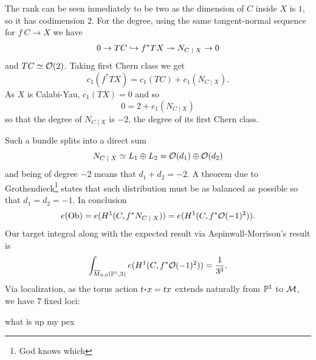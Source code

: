 \documentclass[12pt]{memoir}
\begin{document}
\begin{ptcbp}
    The rank can be seen inmediately to be two as the dimension of $C$ inside $X$ is $1$, so it has codimension $2$. For the degree, using the same tangent-normal sequence for $f\: C\to X$ we have 
    $$0\to TC\hookto f^\ast TX\onto N_{C\mid X}\to 0$$
    and $TC\simeq\mathcal{O}(2)$. Taking first Chern class we get
    $$c_1(f^\ast TX)=c_1(TC)+c_1(N_{C\mid X}).$$
    As $X$ is Calabi-Yau, $c_1(TX)=0$ and so 
    $$0=2+c_1(N_{C\mid X})$$
    so that the degree of $N_{C\mid X}$ is $-2$, the degree of its first Chern class.
\end{ptcbp}

Such a bundle splits into a direct sum 
$$N_{C\mid X}\isom L_1\oplus L_2=\cO(d_1)\oplus\cO(d_2)$$
and being of degree $-2$ means that $d_1+d_2=-2$. A theorem due to Grothendieck\footnote{God knows which} states that such distribution must be as balanced as possible so that $d_1=d_2=-1$. In conclusion
$$e(\Ob)=e(H^1(C,f^\ast N_{C\mid X}))=e(H^1(C,f^\ast\cO(-1)^2)).$$
Our target integral along with the expected result via Aspinwall-Morrison's result is
$$\int_{\overline{M}_{0,0}(\mathbb{P}^1,3)}e(H^1(C,f^\ast\mathcal{O}(-1)^2))=\frac{1}{3^3}.$$
Via localization, as the torus action $t\.x=tx$ extends naturally from $\mathbb{P}^1$ to $\mathcal{M}$, we have $7$ fixed loci:

what is up my pex

\ifx\nextra\undefined
\printindex
\else\fi
\nocite{*}


\end{document}
